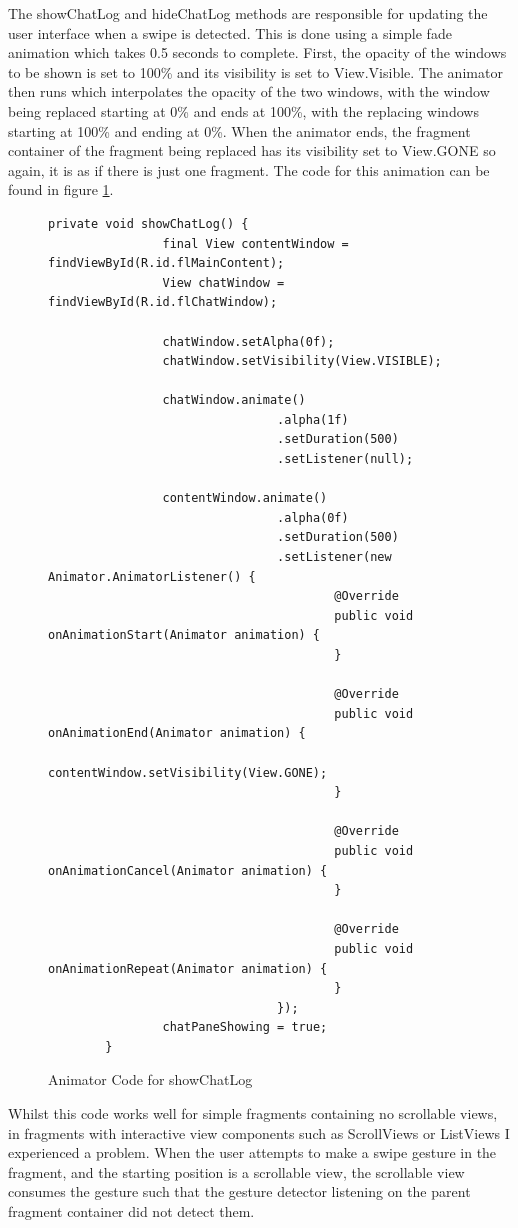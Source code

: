The showChatLog and hideChatLog methods are responsible for updating the user interface when a swipe is detected.  This is done using a simple fade animation which takes 0.5 seconds to complete.  First, the opacity of the windows to be shown is set to 100\% and its visibility is set to View.Visible.  The animator then runs which interpolates the opacity of the two windows, with the window being replaced starting at 0\% and ends at 100\%, with the replacing windows starting at 100\% and ending at 0\%.  When the animator ends, the fragment container of the fragment being replaced has its visibility set to View.GONE so again, it is as if there is just one fragment.  The code for this animation can be found in figure \ref{fig:showChatLog}.

\begin{figure}[!htpb]
	\centering
	\lstset{language=Java}
	\begin{lstlisting}[tabsize=2,breaklines=true]
		private void showChatLog() {
				final View contentWindow = findViewById(R.id.flMainContent);
				View chatWindow = findViewById(R.id.flChatWindow);

				chatWindow.setAlpha(0f);
				chatWindow.setVisibility(View.VISIBLE);

				chatWindow.animate()
								.alpha(1f)
								.setDuration(500)
								.setListener(null);

				contentWindow.animate()
								.alpha(0f)
								.setDuration(500)
								.setListener(new Animator.AnimatorListener() {
										@Override
										public void onAnimationStart(Animator animation) {
										}

										@Override
										public void onAnimationEnd(Animator animation) {
												contentWindow.setVisibility(View.GONE);
										}

										@Override
										public void onAnimationCancel(Animator animation) {
										}

										@Override
										public void onAnimationRepeat(Animator animation) {
										}
								});
				chatPaneShowing = true;
		}
	\end{lstlisting}
	\caption{Animator Code for showChatLog}
	\label{fig:showChatLog}
\end{figure}

Whilst this code works well for simple fragments containing no scrollable views, in fragments with interactive view components such as ScrollViews\cite{androidScrollView} or ListViews\cite{androidListView} I experienced a problem.  When the user attempts to make a swipe gesture in the fragment, and the starting position is a scrollable view, the scrollable view consumes the gesture such that the gesture detector listening on the parent fragment container did not detect them.

